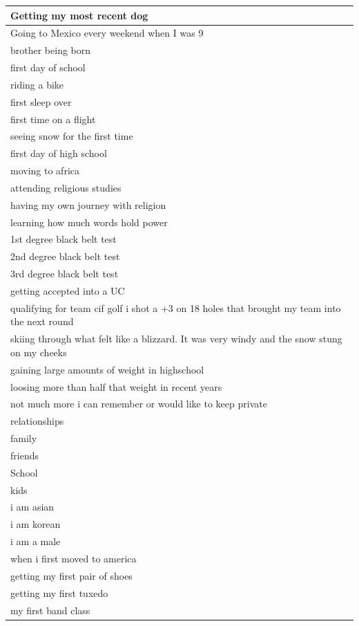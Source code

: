 \documentclass[
  .7em,
  letterpaper,
  DIV=11,
  numbers=noendperiod]{scrartcl}
\begin{document}
\begin{table}
\begin{tabular}{l}
\hline
Getting my most recent dog\\
\hline
Going to Mexico every weekend when I was 9\\
\hline
brother being born\\
\hline
first day of school\\
\hline
riding a bike\\
\hline
first sleep over\\
\hline
first time on a flight\\
\hline
seeing snow for the first time\\
\hline
first day of high school\\
\hline
moving to africa\\
\hline
attending religious studies\\
\hline
having my own journey with religion\\
\hline
learning how much words hold power\\
\hline
1st degree black belt test\\
\hline
2nd degree black belt test\\
\hline
3rd degree black belt test\\
\hline
getting accepted into a UC\\
\hline
qualifying for team cif golf i shot a +3 on 18 holes that brought my team into the next round\\
\hline
skiing through what felt like a blizzard. It was very windy and the snow stung on my cheeks\\
\hline
gaining large amounts of weight in highschool\\
\hline
loosing more than half that weight in recent years\\
\hline
not much more i can remember or would like to keep private\\
\hline
relationships\\
\hline
family\\
\hline
friends\\
\hline
School\\
\hline
kids\\
\hline
i am asian\\
\hline
i am korean\\
\hline
i am a male\\
\hline
when i first moved to america\\
\hline
getting my first pair of shoes\\
\hline
getting my first tuxedo\\
\hline
my first band class\\

\end{tabular}
\end{table}
\end{document}
